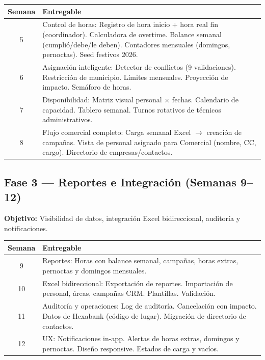 \documentclass[10pt,a4paper]{article}
\begin{document}
\begin{table}[h!]
\centering
\begin{tabularx}{\textwidth}{|c|X|}
\hline
\textbf{Semana} & \textbf{Entregable} \\
\hline
5 & Control de horas: Registro de hora inicio + hora real fin (coordinador). Calculadora de overtime. Balance semanal (cumpli\'{o}/debe/le deben). Contadores mensuales (domingos, pernoctas). Seed festivos 2026. \\
\hline
6 & Asignaci\'{o}n inteligente: Detector de conflictos (9 validaciones). Restricci\'{o}n de municipio. L\'{i}mites mensuales. Proyecci\'{o}n de impacto. Sem\'{a}foro de horas. \\
\hline
7 & Disponibilidad: Matriz visual personal $\times$ fechas. Calendario de capacidad. Tablero semanal. Turnos rotativos de t\'{e}cnicos administrativos. \\
\hline
8 & Flujo comercial completo: Carga semanal Excel $\rightarrow$ creaci\'{o}n de campañas. Vista de personal asignado para Comercial (nombre, CC, cargo). Directorio de empresas/contactos. \\
\hline
\end{tabularx}
\end{table}

\subsection{Fase 3 --- Reportes e Integraci\'{o}n (Semanas 9--12)}

\textbf{Objetivo:} Visibilidad de datos, integraci\'{o}n Excel bidireccional, auditor\'{i}a y notificaciones.

\begin{table}[h!]
\centering
\begin{tabularx}{\textwidth}{|c|X|}
\hline
\textbf{Semana} & \textbf{Entregable} \\
\hline
9 & Reportes: Horas con balance semanal, campañas, horas extras, pernoctas y domingos mensuales. \\
\hline
10 & Excel bidireccional: Exportaci\'{o}n de reportes. Importaci\'{o}n de personal, \'{a}reas, campañas CRM. Plantillas. Validaci\'{o}n. \\
\hline
11 & Auditor\'{i}a y operaciones: Log de auditor\'{i}a. Cancelaci\'{o}n con impacto. Datos de Hexabank (c\'{o}digo de lugar). Migraci\'{o}n de directorio de contactos. \\
\hline
12 & UX: Notificaciones in-app. Alertas de horas extras, domingos y pernoctas. Diseño responsive. Estados de carga y vac\'{i}os. \\
\hline
\end{tabularx}
\end{table}
\end{document}
